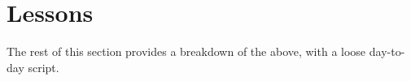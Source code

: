 \chapter{Lessons}

The rest of this section provides a breakdown of the above, with a loose day-to-day script.

{
    \newcommand{\multiplechoice}[5]{
        \textbf{#1}
        \begin{enumerate}[label=(\Alph*)]
            \item #2 (correct)
            \item #3
            \item #4
            \item #5
        \end{enumerate}
    }













}